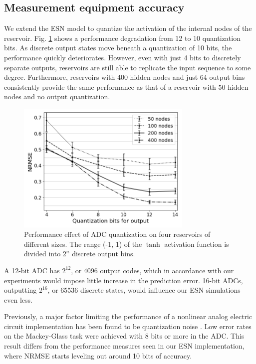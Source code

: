 \subsection{Measurement equipment accuracy}

We extend the ESN model to quantize the activation of the internal nodes of the
reservoir. Fig. \ref{adc_quantization} shows a performance degradation from 12
to 10 quantization bits. As discrete output states move beneath a quantization
of 10 bits, the performance quickly deteriorates. However, even with just 4 bits
to discretely separate outputs, reservoirs are still able to replicate the input
sequence to some degree. Furthermore, reservoirs with 400 hidden nodes and just
64 output bins consistently provide the same performance as that of a reservoir
with 50 hidden nodes and no output quantization.

\begin{figure}
  \centering
  \includegraphics[width=3.3in]{img/adc_quantization.png}
  \caption{
    Performance effect of ADC quantization on four reservoirs of different
sizes. The range (-1, 1) of the $\tanh$ activation function is divided into
$2^n$ discrete output bins.
  }
  \label{adc_quantization}
\end{figure}

A 12-bit ADC has $2^{12}$, or 4096 output codes, which in accordance with our
experiments would impose little increase in the prediction error. 16-bit ADCs,
outputting $2^{16}$, or 65536 discrete states, would influence our ESN
simulations even less.

Previously, a major factor limiting the performance of a nonlinear analog
electric circuit implementation has been found to be quantization noise
\cite{soriano_delay-based_2015}. Low error rates on the Mackey-Glass task were
achieved with 8 bits or more in the ADC. This result differs from the
performance measures seen in our ESN implementation, where NRMSE starts leveling
out around 10 bits of accuracy.

